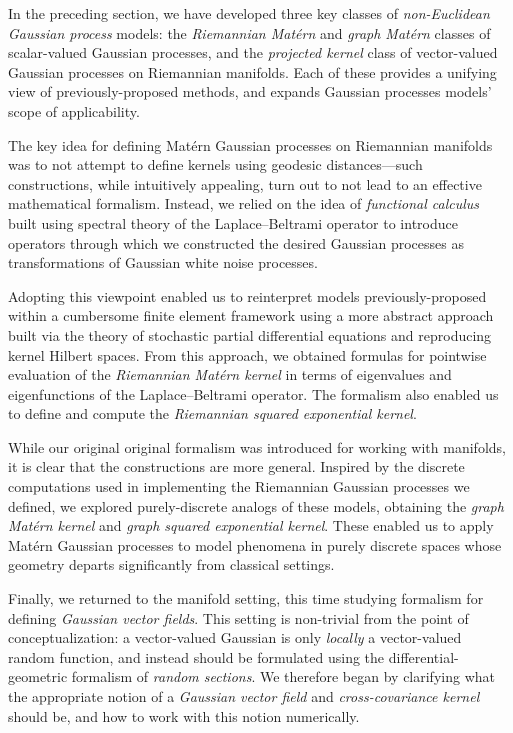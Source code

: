 \documentclass[11pt]{book}
\begin{document}
In the preceding section, we have developed three key classes of \emph{non-Euclidean Gaussian process} models: the \emph{Riemannian Matérn} and \emph{graph Matérn} classes of scalar-valued Gaussian processes, and the \emph{projected kernel} class of vector-valued Gaussian processes on Riemannian manifolds.
Each of these provides a unifying view of previously-proposed methods, and expands Gaussian processes models' scope of applicability.

The key idea for defining Matérn Gaussian processes on Riemannian manifolds was to not attempt to define kernels using geodesic distances---such constructions, while intuitively appealing, turn out to not lead to an effective mathematical formalism.
Instead, we relied on the idea of \emph{functional calculus} built using spectral theory of the Laplace--Beltrami operator to introduce operators through which we constructed the desired Gaussian processes as transformations of Gaussian white noise processes.

Adopting this viewpoint enabled us to reinterpret models previously-proposed within a cumbersome finite element framework using a more abstract approach built via the theory of stochastic partial differential equations and reproducing kernel Hilbert spaces.
From this approach, we obtained formulas for pointwise evaluation of the \emph{Riemannian Matérn kernel} in terms of eigenvalues and eigenfunctions of the Laplace--Beltrami operator.
The formalism also enabled us to define and compute the \emph{Riemannian squared exponential kernel}.

While our original original formalism was introduced for working with manifolds, it is clear that the constructions are more general.
Inspired by the discrete computations used in implementing the Riemannian Gaussian processes we defined, we explored purely-discrete analogs of these models, obtaining the \emph{graph Matérn kernel} and \emph{graph squared exponential kernel}.
These enabled us to apply Matérn Gaussian processes to model phenomena in purely discrete spaces whose geometry departs significantly from classical settings.

Finally, we returned to the manifold setting, this time studying formalism for defining \emph{Gaussian vector fields}.
This setting is non-trivial from the point of conceptualization: a vector-valued Gaussian is only \emph{locally} a vector-valued random function, and instead should be formulated using the differential-geometric formalism of \emph{random sections}.
We therefore began by clarifying what the appropriate notion of a \emph{Gaussian vector field}  and \emph{cross-covariance kernel} should be, and how to work with this notion numerically.
\end{document}

